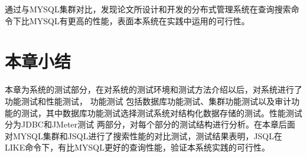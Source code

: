 通过与MYSQL集群对比，发现论文所设计和开发的分布式管理系统在查询搜索命令下比MYSQL有更高的性能，表面本系统在实践中运用的可行性。
\section{本章小结}
本章为系统的测试部分，在对系统的测试环境和测试方法介绍以后，对系统进行了功能测试和性能测试，
功能测试
包括数据库功能测试、集群功能测试以及审计功能的测试，其中数据库功能测试选择测试系统对结构化数据存储的测试。性能测试分为JDBC和JMeter测试
两部分，对每个部分的测试结构进行分析。在本章后面对MYSQL集群和JSQL进行了搜索性能的对比测试，测试结果表明，JSQL在LIKE命令下，有比MYSQL更好的查询性能，验证本系统实践的可行性。